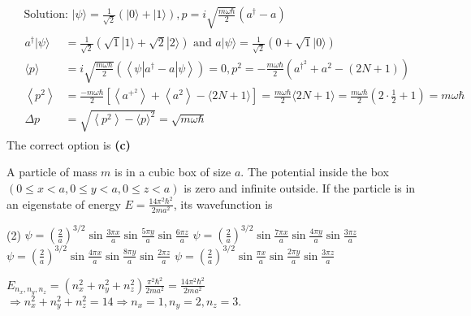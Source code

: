 \begin{enumerate}
\begin{answer}
	$\begin{aligned}
	&\text { Solution: }|\psi\rangle=\frac{1}{\sqrt{2}}(|0\rangle+|1\rangle), p=i \sqrt{\frac{m \omega \hbar}{2}}\left(a^{\dagger}-a\right) \\
	&\begin{aligned}
	a^{\dagger}|\psi\rangle &=\frac{1}{\sqrt{2}}(\sqrt{1}|1\rangle+\sqrt{2}|2\rangle) \text { and } a|\psi\rangle=\frac{1}{\sqrt{2}}(0+\sqrt{1}|0\rangle) \\
	\langle p\rangle &=i \sqrt{\frac{m \omega \hbar}{2}}\left(\left\langle\psi\left|a^{\dagger}-a\right| \psi\right\rangle\right)=0, p^{2}=-\frac{m \omega \hbar}{2}\left(a^{\dagger^{2}}+a^{2}-(2 N+1)\right) \\
	\left\langle p^{2}\right\rangle &=\frac{-m \omega \hbar}{2}\left[\left\langle a^{+^{2}}\right\rangle+\left\langle a^{2}\right\rangle-\langle 2 N+1\rangle\right]=\frac{m \omega \hbar}{2}\langle 2 N+1\rangle=\frac{m \omega \hbar}{2}\left(2 \cdot \frac{1}{2}+1\right)=m \omega \hbar \\
	\Delta p &=\sqrt{\left\langle p^{2}\right\rangle-\langle p\rangle^{2}}=\sqrt{m \omega \hbar}
	\end{aligned}
	\end{aligned}$\\
	The correct option is \textbf{(c)}	
\end{answer}
\begin{minipage}{\textwidth}
	\item A particle of mass $m$ is in a cubic box of size $a$. The potential inside the box $(0 \leq x<a, 0 \leq y<a, 0 \leq z<a)$ is zero and infinite outside. If the particle is in an eigenstate of energy $E=\frac{14 \pi^{2} \hbar^{2}}{2 m a^{2}}$, its wavefunction is
\end{minipage}
\begin{tasks}(2)
	\task[\textbf{A.}] $\psi=\left(\frac{2}{a}\right)^{3 / 2} \sin \frac{3 \pi x}{a} \sin \frac{5 \pi y}{a} \sin \frac{6 \pi z}{a}$
	\task[\textbf{B.}] $\psi=\left(\frac{2}{a}\right)^{3 / 2} \sin \frac{7 \pi x}{a} \sin \frac{4 \pi y}{a} \sin \frac{3 \pi z}{a}$
	\task[\textbf{C.}]$\psi=\left(\frac{2}{a}\right)^{3 / 2} \sin \frac{4 \pi x}{a} \sin \frac{8 \pi y}{a} \sin \frac{2 \pi z}{a}$
	\task[\textbf{D.}]$\psi=\left(\frac{2}{a}\right)^{3 / 2} \sin \frac{\pi x}{a} \sin \frac{2 \pi y}{a} \sin \frac{3 \pi z}{a}$
\end{tasks}
\begin{answer}
	$E_{n_{x}, n_{y}, n_{z}}=\left(n_{x}^{2}+n_{y}^{2}+n_{z}^{2}\right) \frac{\pi^{2} \hbar^{2}}{2 m a^{2}}=\frac{14 \pi^{2} \hbar^{2}}{2 m a^{2}}$ $\Rightarrow n_{x}^{2}+n_{y}^{2}+n_{z}^{2}=14 \Rightarrow n_{x}=1, n_{y}=2, n_{z}=3 .$\\

\end{answer}
\end{enumerate}
